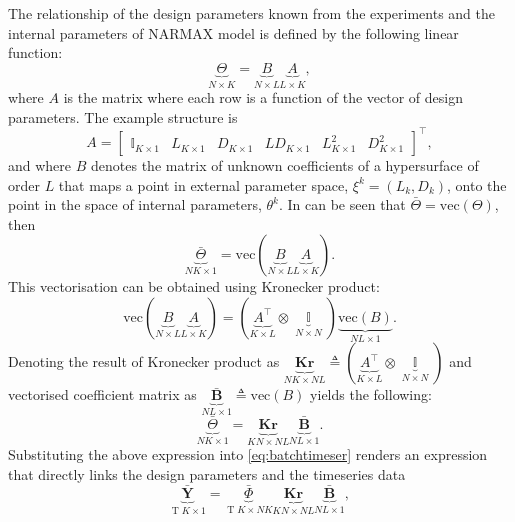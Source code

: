 \documentclass[a4paper,11pt,twoside]{article}
\DeclareMathOperator{\eye}{\mathbb{I}}
\DeclareMathOperator{\T}{\mathrm{T}}
\theoremstyle{mytheoremstyle}
\begin{document}
\par The relationship of the design parameters known from the experiments and the internal parameters of NARMAX model  is defined by the following linear function:
\begin{equation}
\underbrace{\Theta}_{N \times K} = \underbrace{B}_{N \times L} \underbrace{A}_{L \times K},
\end{equation}
where $A$ is the matrix where each row is a function of the vector of design parameters. The example structure is
\begin{equation}
A = \left[\begin{array}{cccccc}
\eye_{K \times 1} & L_{K \times 1} & D_{K \times 1} & L D_{K \times 1} &  L^{2}_{K \times 1} & D^{2}_{K \times 1} 
\end{array}\right]^{\top},
\end{equation} 
and where $B$ denotes the matrix of unknown coefficients of a hypersurface of order $L$ that maps a point in external parameter space, $\xi^k = (L_k, D_k)$, onto the point in the space of internal parameters, $\theta^k$.
In can be seen that $\bar{\Theta} = \text{vec}(\Theta)$, then
\begin{equation}
\underbrace{\bar{\Theta}}_{NK \times 1} = \text{vec}\left(\underbrace{B}_{N \times L} \underbrace{A}_{L \times K}\right).
\end{equation}
This vectorisation can be obtained using Kronecker product:
\begin{equation}
\text{vec}\left(\underbrace{B}_{N \times L} \underbrace{A}_{L \times K}\right) = (\underbrace{A^{\top}}_{K \times L} \otimes \underbrace{\eye}_{N \times N}) \underbrace{\text{vec}(B)}_{NL \times 1}.
\end{equation}
Denoting the result of Kronecker product as $\underbrace{\mathbf{Kr}}_{NK \times NL} \triangleq (\underbrace{A^{\top}}_{K \times L} \otimes \underbrace{\eye}_{N \times N})$ and vectorised coefficient matrix as $\underbrace{\bar{\mathbf{B}}}_{NL \times 1} \triangleq \text{vec}(B)$  yields the following:
\begin{equation}\label{eq:BtoTheta}
\underbrace{\bar{\Theta}}_{NK \times 1} = \underbrace{\mathbf{Kr}}_{KN \times NL} \underbrace{\bar{\mathbf{B}}}_{NL \times 1}.
\end{equation}
Substituting the above expression into \eqref{eq:batchtimeser} renders an expression that directly links the design parameters and the timeseries data
\begin{equation}\label{eq:BtoY}
\underbrace{\bar{\mathbf{Y}}}_{\T K\times 1} = \underbrace{\bar{\Phi}}_{\T K \times NK} \underbrace{\mathbf{Kr}}_{KN \times NL} \underbrace{\bar{\mathbf{B}}}_{NL \times 1},
\end{equation}
\end{document}
